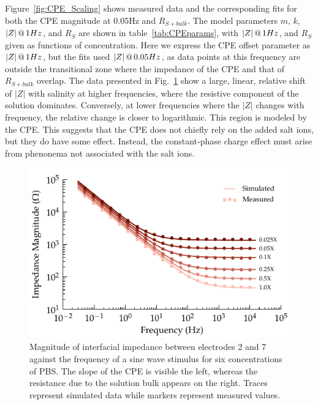 \documentclass[journal, a4paper]{IEEEtran}
\begin{document}
Figure~\ref{fig:CPE_Scaling} shows measured data and the corresponding fits for both the CPE magnitude at 0.05\thinspace Hz and $R_{S+bulk}$. The model parameters $m$, $k$, $|Z|\thinspace @\thinspace 1Hz$, and $R_S$ are shown in table~\ref{tab:CPEparams}, with $|Z|\thinspace @\thinspace 1Hz$, and $R_S$ given as functions of concentration. 
Here we express the CPE offset parameter as $|Z|\thinspace @ \thinspace 1Hz$, but the fits used $|Z|\thinspace @ \thinspace 0.05Hz$, as data points at this frequency are outside the transitional zone where the impedance of the CPE and that of $R_{S+bulk}$ overlap.
{
    \color{blue} The data presented in Fig.~\ref{fig:CPE_Magnitude} show a large, linear, relative shift of $|Z|$ with salinity at higher frequencies, where the resistive component of the solution dominates.
Conversely, at lower frequencies where the $|Z|$ changes with frequency, the relative change is closer to logarithmic. This region is modeled by the CPE. 
This suggests that the CPE does not chiefly rely on the added salt ions, but they do have some effect. 
Instead, the constant-phase charge effect must arise from phenonema not associated with the salt ions.
}


\begin{figure}
    \begin{center}
        \includegraphics{graphics/displacement_impedanceVsFrequency_magnitude}
    \end{center}
    \caption{Magnitude of interfacial impedance between electrodes 2 and 7 against the frequency of a sine wave stimulus for six concentrations of PBS. The slope of the CPE is visible the left, whereas the resistance due to the solution bulk appears on the right. Traces represent simulated data while markers represent measured values.}
    \label{fig:CPE_Magnitude}
\end{figure}
\end{document}
